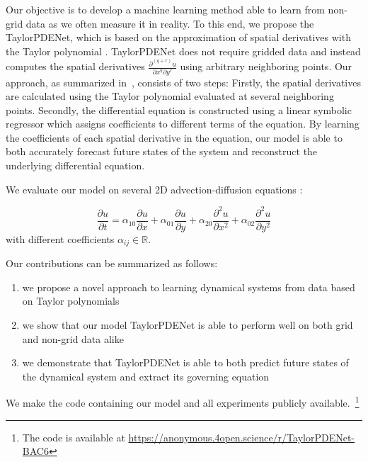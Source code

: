 \documentclass[runningheads]{llncs}
\begin{document}
Our objective is to develop a machine learning method able to learn from non-grid data as we often measure it in reality.
To this end, we propose the TaylorPDENet, which is based on the approximation of spatial derivatives with the Taylor polynomial \cite{gulsu2006taylor}.
TaylorPDENet does not require gridded data and instead computes the spatial derivatives $\frac{\partial^{(q+r)}u}{\partial x^q \partial y^r}$ using arbitrary neighboring points.
Our approach, as summarized in~, consists of two steps:
Firstly, the spatial derivatives are calculated using the Taylor polynomial evaluated at several neighboring points.
Secondly, the differential equation is constructed using a linear symbolic regressor which assigns coefficients to different terms of the equation.
By learning the coefficients of each spatial derivative in the equation, our model is able to both accurately forecast future states of the system\cite{dulny2022neuralpde,cai2021physics} and reconstruct the underlying differential equation.

We evaluate our model on several 2D advection-diffusion equations \cite{dehghan2004numerical}:

\begin{equation}\label{eq:form}
    \frac{\partial u}{\partial t} = \alpha_{10}\frac{\partial u}{\partial x}+ \alpha_{01}\frac{\partial u}{\partial y}+ \alpha_{20}\frac{\partial^2 u}{\partial x^2}+ \alpha_{02}\frac{\partial^2 u}{\partial y^2}
\end{equation}
with different coefficients $\alpha_{ij}\in\mathbb{R}$.

Our contributions can be summarized as follows:
\begin{enumerate}
    \item we propose a novel approach to learning dynamical systems from data based on Taylor polynomials
    \item we show that our model TaylorPDENet is able to perform well on both grid and non-grid data alike
    \item we demonstrate that TaylorPDENet is able to both predict future states of the dynamical system and extract its governing equation
\end{enumerate}
We make the code containing our model and all experiments publicly available.~\footnote{The code is available at \url{https://anonymous.4open.science/r/TaylorPDENet-BAC6}}
%
\end{document}
